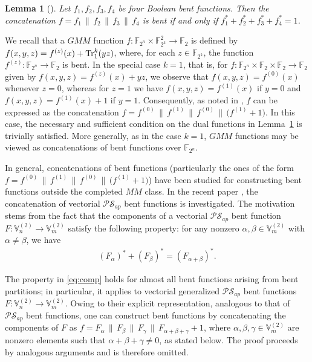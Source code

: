 \documentclass[12pt]{article}
\theoremstyle{plain}
\newtheorem{lemma}{Lemma}
\theoremstyle{definition}
\newcommand{\V}{\mathbb{V}}
\renewcommand{\to}{\rightarrow}
\newcommand{\Tr}{{\rm Tr}}
\begin{document}
	\begin{lemma}[{\cite[Theorem~III.1]{hpz}}]
		\label{ffff=1}
		Let $f_1,f_2,f_3,f_4$ be four Boolean bent functions. Then the concatenation $f = f_1 \,\|\, f_2 \,\|\, f_3 \,\|\, f_4$
		is bent if and only if $f_1^* + f_2^* + f_3^* + f_4^* = 1$.
	\end{lemma}
	
	We recall that a $GMM$ function $f \colon \mathbb{F}_{2^n} \times \mathbb{F}_{2^k}^2 \to \mathbb{F}_2$
	is defined by $f(x,y,z) = f^{(z)}(x) + \Tr_1^k(yz)$,
	where, for each $z \in \mathbb{F}_{2^k}$, the function
	$f^{(z)} \colon \mathbb{F}_{2^n} \to \mathbb{F}_2$ is bent.
	In the special case $k=1$, that is, for
	$f \colon \mathbb{F}_{2^n} \times \mathbb{F}_2 \times  \mathbb{F}_2 \to \mathbb{F}_2$
	given by $f(x,y,z)=f^{(z)}(x)+yz$, we observe that
	$f(x,y,z)=f^{(0)}(x)$ whenever $z=0$, whereas for $z=1$ we have
	$f(x,y,z)=f^{(1)}(x)$ if $y=0$ and
	$f(x,y,z)=f^{(1)}(x)+1$ if $y=1$.
	Consequently, as noted in \cite{akkmpp26}, $f$ can be expressed as the
	concatenation $f = f^{(0)} \,\|\, f^{(1)} \,\|\, f^{(0)} \,\|\, \bigl(f^{(1)}+1\bigr)$. 
	In this case, the necessary and sufficient condition on the dual
	functions in Lemma~\ref{ffff=1} is trivially satisfied.
	More generally, as in the case $k=1$, $GMM$ functions may be viewed as
	concatenations of bent functions over $\mathbb{F}_{2^n}$.
	
	In general, concatenations of bent functions (particularly the ones of the form $f = f^{(0)} \,\|\, f^{(1)} \,\|\, f^{(0)} \,\|\, \bigl(f^{(1)}+1\bigr)$) have been studied for constructing bent functions outside the
	completed $MM$ class. In the recent paper \cite{akkmpp26}, the
	concatenation of vectorial $\mathcal{PS}_{ap}$ bent functions is
	investigated. The motivation stems from the fact that the components of
	a vectorial $\mathcal{PS}_{ap}$ bent function $F \colon \V_n^{(2)} \to \V_m^{(2)}$
	satisfy the following property: for any nonzero
	$\alpha, \beta \in \V_m^{(2)}$ with $\alpha \ne \beta$, we have
	\begin{align}\label{eq:comp}
		(F_\alpha)^{*} + (F_\beta)^{*} = (F_{\alpha+\beta})^{*}.  
	\end{align}
	
	The property in \eqref{eq:comp} holds for almost all bent functions arising from bent partitions; in particular, it applies to vectorial generalized $\mathcal{PS}_{ap}$ bent functions $F \colon \V_n^{(2)} \to \V_m^{(2)}$. Owing to their explicit representation, analogous to that of $\mathcal{PS}_{ap}$ bent functions, one can construct bent functions by concatenating the components of $F$ as $f = F_\alpha \,\|\, F_\beta \,\|\, F_\gamma \,\|\, F_{\alpha+\beta+\gamma} + 1$, where $\alpha, \beta, \gamma \in \V_m^{(2)}$ are nonzero elements such that $\alpha + \beta + \gamma \ne 0$, as stated below. The proof proceeds by analogous arguments and is therefore omitted.
	
\end{document}
